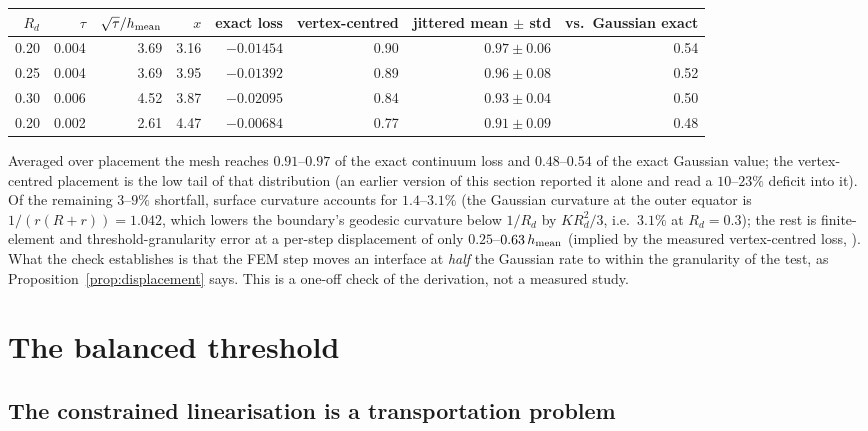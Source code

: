 \documentclass[11pt,a4paper]{article}
\begin{document}
\begin{center}\footnotesize
\begin{tabular}{@{}rrrrrrrr@{}}
\toprule
$R_d$ & $\tau$ & $\sqrt\tau/h_{\mathrm{mean}}$ & $x$ & exact loss & vertex-centred & jittered mean $\pm$ std & vs.\ Gaussian exact \\
\midrule
0.20 & 0.004 & 3.69 & 3.16 & $-0.01454$ & 0.90 & $0.97 \pm 0.06$ & 0.54 \\
0.25 & 0.004 & 3.69 & 3.95 & $-0.01392$ & 0.89 & $0.96 \pm 0.08$ & 0.52 \\
0.30 & 0.006 & 4.52 & 3.87 & $-0.02095$ & 0.84 & $0.93 \pm 0.04$ & 0.50 \\
0.20 & 0.002 & 2.61 & 4.47 & $-0.00684$ & 0.77 & $0.91 \pm 0.09$ & 0.48 \\
\bottomrule
\end{tabular}
\end{center}

Averaged over placement the mesh reaches $0.91$--$0.97$ of the exact continuum
loss and $0.48$--$0.54$ of the exact Gaussian value; the vertex-centred
placement is the low tail of that distribution (an earlier version of this
section reported it alone and read a $10$--$23\%$ deficit into it). Of the
remaining $3$--$9\%$ shortfall, surface curvature accounts for $1.4$--$3.1\%$
(the Gaussian curvature at the outer equator is $1/(r(R + r)) = 1.042$, which
lowers the boundary's geodesic curvature below $1/R_d$ by $K R_d^2/3$, i.e.\
$3.1\%$ at $R_d = 0.3$); the rest is finite-element and threshold-granularity
error at a per-step displacement of only $0.25$--$0.63\, h_{\mathrm{mean}}$ (implied by the
measured vertex-centred loss, \code{displacement\_over\_h\_mean}). What the check establishes is that
the FEM step moves an interface at \emph{half} the Gaussian rate to within the
granularity of the test, as Proposition~\ref{prop:displacement} says. This is a
one-off check of the derivation, not a measured study.

\section{The balanced threshold}
\label{sec:assignment}

\subsection{The constrained linearisation is a transportation problem}
\end{document}
